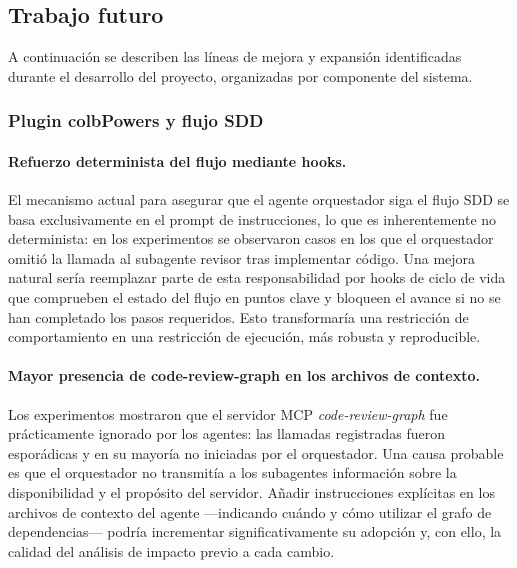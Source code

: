\documentclass[11pt, letterpaper]{article}
\begin{document}
\newpage

\subsection{Trabajo futuro}
\label{sec:trabajo_futuro}

A continuación se describen las líneas de mejora y expansión identificadas durante el desarrollo del proyecto, organizadas por componente del sistema.

\subsubsection{Plugin colbPowers y flujo SDD}

\paragraph{Refuerzo determinista del flujo mediante hooks.}
El mecanismo actual para asegurar que el agente orquestador siga el flujo SDD se basa exclusivamente en el prompt de instrucciones, lo que es inherentemente no determinista: en los experimentos se observaron casos en los que el orquestador omitió la llamada al subagente revisor tras implementar código. Una mejora natural sería reemplazar parte de esta responsabilidad por hooks de ciclo de vida que comprueben el estado del flujo en puntos clave y bloqueen el avance si no se han completado los pasos requeridos. Esto transformaría una restricción de comportamiento en una restricción de ejecución, más robusta y reproducible.

\paragraph{Mayor presencia de code-review-graph en los archivos de contexto.}
Los experimentos mostraron que el servidor MCP \textit{code-review-graph} fue prácticamente ignorado por los agentes: las llamadas registradas fueron esporádicas y en su mayoría no iniciadas por el orquestador. Una causa probable es que el orquestador no transmitía a los subagentes información sobre la disponibilidad y el propósito del servidor. Añadir instrucciones explícitas en los archivos de contexto del agente ---indicando cuándo y cómo utilizar el grafo de dependencias--- podría incrementar significativamente su adopción y, con ello, la calidad del análisis de impacto previo a cada cambio.
\end{document}
